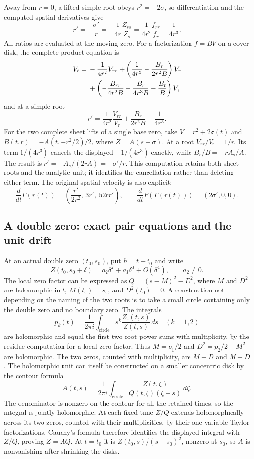 Away from $r=0$, a lifted simple root obeys $r^2=-2\sigma$,
so differentiation and the computed spatial derivatives give
\begin{equation}
 r'=-\frac{\sigma'}r
    =-\frac1{4r}\frac{Z_{ss}}{Z_s}
    =\frac1{4r^2}\frac{f_{rr}}{f_r}-\frac1{4r^3}.
 \label{eq:zt-simple-cover}
\end{equation}
All ratios are evaluated at the moving zero.  For a factorization
$f=BV$ on a cover disk, the complete product equation is
\begin{align}
 V_t={}&-\frac1{4r^2}V_{rr}
       +\left(\frac1{4r^3}-\frac{B_r}{2r^2B}\right)V_r\notag\\
 &+\left(-\frac{B_{rr}}{4r^2B}
              +\frac{B_r}{4r^3B}-\frac{B_t}{B}\right)V,
 \label{eq:zt-cover-unit-pde}
\end{align}
and at a simple root
\[
 r'=\frac1{4r^2}\frac{V_{rr}}{V_r}
                    +\frac{B_r}{2r^2B}-\frac1{4r^3}.
\]
For the two complete sheet lifts of a single base zero, take
$V=r^2+2\sigma(t)$ and
$B(t,r)=-A(t,-r^2/2)/2$, where $Z=A(s-\sigma)$.
At a root $V_{rr}/V_r=1/r$.  Its term $1/(4r^3)$ cancels the
displayed $-1/(4r^3)$ exactly, while
$B_r/B=-rA_s/A$.  The result is
$r'=-A_s/(2rA)=-\sigma'/r$.
This computation retains both sheet roots and the analytic unit;
it identifies the cancellation rather than deleting either term.
The original spatial velocity is also explicit:
\[
 \frac{d}{dt}\Gamma(r(t))
 =\left(\frac{r'}{2r^2},\ 3r',\ 52rr'\right),\qquad
 \frac{d}{dt}F(\Gamma(r(t)))=(2\sigma',0,0).
\]

\subsection{A double zero: exact pair equations and the unit drift}

At an actual double zero $(t_0,s_0)$, put $h=t-t_0$ and write
\[
 Z(t_0,s_0+\delta)=a_2\delta^2+a_3\delta^3+O(\delta^4),
 \qquad a_2\ne0.
\]
The local zero factor can be expressed as
$Q=(s-M)^2-D^2$, where $M$ and $D^2$ are holomorphic in $t$,
$M(t_0)=s_0$, and $D^2(t_0)=0$.  A construction not depending on
the naming of the two roots is to take a small circle containing
only the double zero and no boundary zero.  The integrals
\[
 p_k(t)=\frac1{2\pi i}\int_{\text{circle}}
         s^k\frac{Z_s(t,s)}{Z(t,s)}\,ds\quad(k=1,2)
\]
are holomorphic and equal the first two root power sums with
multiplicity, by the residue computation for a local zero factor.
Thus $M=p_1/2$ and $D^2=p_2/2-M^2$ are holomorphic.  The two
zeros, counted with multiplicity, are $M+D$ and $M-D$.
The holomorphic unit can itself be constructed on a smaller concentric
disk by the contour formula
\[
 A(t,s)=\frac1{2\pi i}\int_{\text{circle}}
       \frac{Z(t,\zeta)}{Q(t,\zeta)(\zeta-s)}\,d\zeta.
\]
The denominator is nonzero on the contour for all the retained times,
so the integral is jointly holomorphic.  At each fixed time $Z/Q$
extends holomorphically across its two zeros, counted with their
multiplicities, by their one-variable Taylor factorizations.  Cauchy's
formula therefore identifies the displayed integral with $Z/Q$, proving
$Z=AQ$.  At $t=t_0$ it is $Z(t_0,s)/(s-s_0)^2$, nonzero at $s_0$,
so $A$ is nonvanishing after shrinking the disks.

